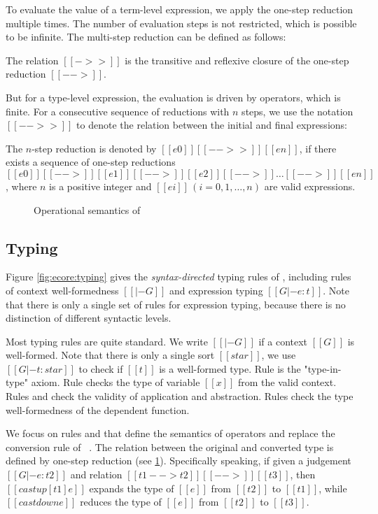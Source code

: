 To evaluate the value of a term-level expression, we apply the one-step reduction multiple times. The number of evaluation steps is not restricted, which is possible to be infinite. The multi-step reduction can be defined as follows:
\begin{dfn}
    The relation $[[->>]]$ is the transitive and reflexive closure of the one-step reduction $[[-->]]$.
\end{dfn}

But for a type-level expression, the evaluation is driven by \cast operators, which is finite. For a consecutive sequence of reductions with $n$ steps, we use the notation $[[-->>]]$ to denote the relation between the initial and final expressions:
\begin{dfn}
    The $n$-step reduction is denoted by $[[e0]] [[-->>]] [[en]]$, if there exists a sequence of one-step reductions $[[e0]] [[-->]] [[e1]] [[-->]] [[e2]] [[-->]] \dots [[-->]] [[en]]$, where $n$ is a positive integer and $[[ei]]\,(i=0,1,\dots,n)$ are valid expressions.
\end{dfn}

\begin{figure}
    \ottdefnstep{}
    \caption{Operational semantics of \ecore}
    \label{fig:ecore:opsem}
\end{figure}

\subsection{Typing}\label{sec:ecore:type}
Figure \ref{fig:ecore:typing} gives the \emph{syntax-directed} typing rules of \ecore, including rules of context well-formedness $[[|- G]]$ and expression typing $[[G |- e : t]]$. Note that there is only a single set of rules for expression typing, because there is no distinction of different syntactic levels.

Most typing rules are quite standard. We write $[[|- G]]$ if a context $[[G]]$ is well-formed. Note that there is only a single sort $[[star]]$, we use $[[G |- t : star]]$ to check if $[[t]]$ is a well-formed type. Rule  is the "type-in-type" axiom. Rule  checks the type of variable $[[x]]$ from the valid context. Rules  and  check the validity of application and abstraction. Rules  check the type well-formedness of the dependent function.

We focus on rules  and  that define the semantics of \cast operators and replace the conversion rule of \cc~. The relation between the original and converted type is defined by one-step reduction (see \ref{fig:ecore:opsem}). Specifically speaking, if given a judgement $[[G |- e : t2]]$ and relation $[[t1 --> t2]] [[-->]] [[t3]]$, then $[[castup [t1] e]]$ expands the type of $[[e]]$ from $[[t2]]$ to $[[t1]]$, while $[[castdown e]]$ reduces the type of $[[e]]$ from $[[t2]]$ to $[[t3]]$.

